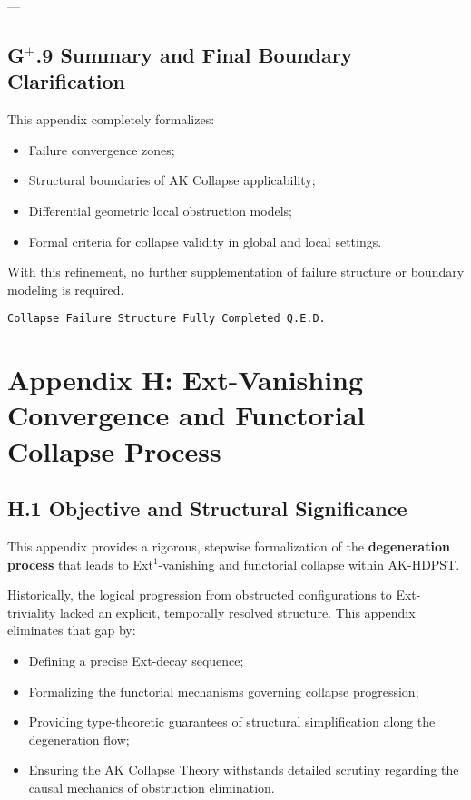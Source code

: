 \documentclass[11pt]{article}
\begin{document}
---

\subsection*{G$^{+}$.9 Summary and Final Boundary Clarification}

This appendix completely formalizes:

\begin{itemize}
    \item Failure convergence zones;
    \item Structural boundaries of AK Collapse applicability;
    \item Differential geometric local obstruction models;
    \item Formal criteria for collapse validity in global and local settings.
\end{itemize}

With this refinement, no further supplementation of failure structure or boundary modeling is required.

\begin{flushright}
\texttt{Collapse Failure Structure \quad Fully Completed \quad Q.E.D.}
\end{flushright}



\section*{Appendix H: Ext-Vanishing Convergence and Functorial Collapse Process}

\subsection*{H.1 Objective and Structural Significance}

This appendix provides a rigorous, stepwise formalization of the \textbf{degeneration process} that leads to Ext$^1$-vanishing and functorial collapse within AK-HDPST.

Historically, the logical progression from obstructed configurations to Ext-triviality lacked an explicit, temporally resolved structure. This appendix eliminates that gap by:

\begin{itemize}
    \item Defining a precise Ext-decay sequence;
    \item Formalizing the functorial mechanisms governing collapse progression;
    \item Providing type-theoretic guarantees of structural simplification along the degeneration flow;
    \item Ensuring the AK Collapse Theory withstands detailed scrutiny regarding the causal mechanics of obstruction elimination.
\end{itemize}
\end{document}
